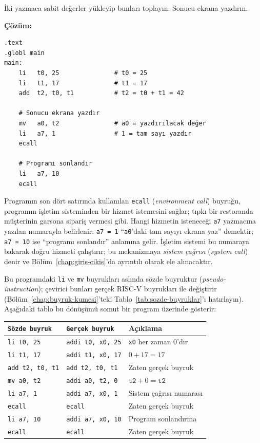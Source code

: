 \begin{ornek}[4.1]
\label{orn:iki-yazmac-topla}
İki yazmaca sabit değerler yükleyip bunları toplayın. Sonucu ekrana yazdırın.

\textbf{Çözüm:}

\begin{lstlisting}[style=riscv]
.text
.globl main
main:
    li   t0, 25               # t0 = 25
    li   t1, 17               # t1 = 17
    add  t2, t0, t1           # t2 = t0 + t1 = 42

    # Sonucu ekrana yazdır
    mv   a0, t2               # a0 = yazdırılacak değer
    li   a7, 1                # 1 = tam sayı yazdır
    ecall

    # Programı sonlandır
    li   a7, 10
    ecall
\end{lstlisting}

Programın son dört satırında kullanılan \texttt{ecall} (\emph{environment call}) buyruğu, programın işletim sisteminden bir hizmet istemesini sağlar; tıpkı bir restoranda müşterinin garsona sipariş vermesi gibi. Hangi hizmetin isteneceği \texttt{a7} yazmacına yazılan numarayla belirlenir: \texttt{a7\,=\,1} ``\texttt{a0}'daki tam sayıyı ekrana yaz'' demektir; \texttt{a7\,=\,10} ise ``programı sonlandır'' anlamına gelir. İşletim sistemi bu numaraya bakarak doğru hizmeti çalıştırır; bu mekanizmaya \emph{sistem çağrısı} (\emph{system call}) denir ve Bölüm~\ref{chap:giris-cikis}'da ayrıntılı olarak ele alınacaktır.

Bu programdaki \texttt{li} ve \texttt{mv} buyrukları aslında sözde buyruktur (\emph{pseudo-instruction}); çevirici bunları gerçek RISC-V buyrukları ile değiştirir (Bölüm~\ref{chap:buyruk-kumesi}'teki Tablo~\ref{tab:sozde-buyruklar}'ı hatırlayın). Aşağıdaki tablo bu dönüşümü somut bir program üzerinde gösterir:

\begin{center}
\small
\begin{tabular}{lll}
\toprule
\texttt{Sözde buyruk} & \texttt{Gerçek buyruk} & Açıklama \\
\midrule
\texttt{li t0, 25}  & \texttt{addi t0, x0, 25} & \texttt{x0} her zaman 0'dır \\
\texttt{li t1, 17}  & \texttt{addi t1, x0, 17} & $0 + 17 = 17$ \\
\texttt{add t2, t0, t1} & \texttt{add t2, t0, t1} & Zaten gerçek buyruk \\
\texttt{mv a0, t2}  & \texttt{addi a0, t2, 0}  & $\texttt{t2} + 0 = \texttt{t2}$ \\
\texttt{li a7, 1}   & \texttt{addi a7, x0, 1}  & Sistem çağrısı numarası \\
\texttt{ecall}       & \texttt{ecall}            & Zaten gerçek buyruk \\
\texttt{li a7, 10}  & \texttt{addi a7, x0, 10} & Program sonlandırma \\
\texttt{ecall}       & \texttt{ecall}            & Zaten gerçek buyruk \\
\bottomrule
\end{tabular}


\end{center}
\end{ornek}

